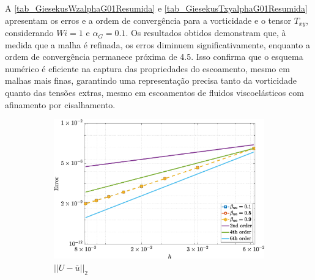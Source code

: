A \autoref{tab_GiesekusWzalphaG01Resumida} e \autoref{tab_GiesekusTxyalphaG01Resumida} apresentam os erros e a ordem de convergência para a vorticidade e o tensor $T_{xy}$, considerando $Wi = 1$ e $\alpha_G = 0.1$. Os resultados obtidos demonstram que, à medida que a malha é refinada, os erros diminuem significativamente, enquanto a ordem de convergência permanece próxima de 4.5. Isso confirma que o esquema numérico é eficiente na captura das propriedades do escoamento, mesmo em malhas mais finas, garantindo uma representação precisa tanto da vorticidade quanto das tensões extras, mesmo em escoamentos de fluidos viscoelásticos com afinamento por cisalhamento.
\begin{figure}[H] 
    \centering 
    \caption{Erro para o campo de velocidade $(\overline{u},\tilde{v})$, vorticidade $(\tilde{\omega_{z}})$, e função de corrente $(\tilde{\psi})$, considerando $Re=100$, $Wi=1$ e $\alpha_G=0.5$, para o escoamento de fluido viscoelástico com o modelo Giesekus}\label{GEerror051}
     \begin{subfigure}[b]{.47\textwidth}
        \includegraphics[width=\textwidth]{figures/Case12/Giesekus/Errors/NormErr_2nd_Re_100_Wi_1_epsilon_0_xi_0_alphaG_0.5_Dt_1e-06_at_0.05_tipsim_1_MMS_12_U.eps}
        \caption{$||U - \overline{u}||_{2}$}
        \label{error_u_2nd_Case1_giesekus_alphaG_0.5}
    \end{subfigure}
    \vspace{0.2cm}
    \qquad
    \begin{subfigure}[b]{.47\textwidth}

\end{subfigure}
\end{figure}
